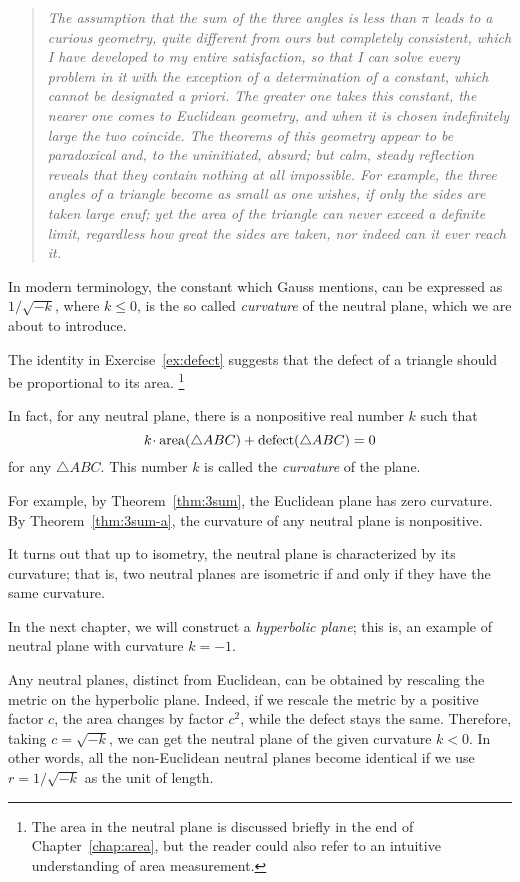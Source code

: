\begin{quotation}{\it
The assumption that the sum of the three angles is less than $\pi$ leads to a curious geometry, 
quite different from ours but completely consistent, 
which I have developed to my entire satisfaction, 
so that I can solve every problem in it with the exception of a determination of a constant, which cannot be designated a priori. 
The greater one takes this constant, the nearer one comes to Euclidean geometry, 
and when it is chosen indefinitely large the two coincide.
The theorems of this geometry appear to be paradoxical and, 
to the uninitiated, absurd; but calm, steady reflection reveals that they contain nothing at all impossible. 
For example, the three angles of a triangle become as small as one wishes, if only the sides are taken large enuf; 
yet the area of the triangle can never exceed a definite limit, regardless how great the sides are taken, 
nor indeed can it ever reach it.}
\end{quotation} 

In modern terminology, the constant which Gauss mentions, 
can be expressed as $1/\sqrt{-k}$, 
where $k\le 0$, is the so called \emph{curvature} of the neutral plane, which we are about to introduce.

The identity in Exercise~\ref{ex:defect} suggests that the defect of a triangle should be proportional to its area.%
\footnote{The area in the neutral plane is discussed briefly in the end of Chapter~\ref{chap:area},
but the reader could also refer to an intuitive understanding of area measurement.}

In fact, for any neutral plane, there is a nonpositive real number $k$
such that 
$$k\cdot\area(\triangle ABC)+\defect(\triangle ABC)=0$$
for any $\triangle ABC$.
This number $k$ is called the \emph{curvature} of the plane.

For example, by Theorem~\ref{thm:3sum}, the Euclidean plane has zero curvature.
By Theorem~\ref{thm:3sum-a}, the curvature of any neutral plane is nonpositive.

It turns out that up to isometry, the neutral plane is characterized by its curvature;
that is, two neutral planes are isometric if and only if they have the same curvature. 

In the next chapter, we will construct a {}\emph{hyperbolic plane};
this is, an example of neutral plane with curvature $k=-1$.

Any neutral planes, distinct from Euclidean,
can be obtained by rescaling the metric on the hyperbolic plane.
Indeed,
if we rescale the metric by a positive factor $c$,
the area changes by factor $c^2$, while the defect stays the same.
Therefore, taking $c=\sqrt{-k}$,
we can get the neutral plane of the given curvature $k<0$.
In other words, all the non-Euclidean neutral planes become identical
if we use $r=1/\sqrt{-k}$ as the unit of length.

